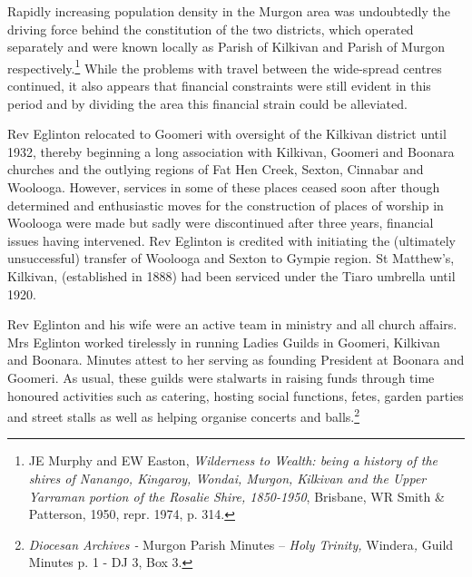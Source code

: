 Rapidly increasing population density in the Murgon area was undoubtedly the driving force behind the constitution of the two districts, which operated separately and were known locally as Parish of Kilkivan and Parish of Murgon respectively.\footnote{JE Murphy and EW Easton, \emph{Wilderness to Wealth: being a history of the shires of Nanango, Kingaroy, Wondai, Murgon, Kilkivan and the Upper Yarraman portion of the Rosalie Shire, 1850-1950}, Brisbane, WR Smith \& Patterson, 1950, repr. 1974, p. 314.} While the problems with travel between the wide-spread centres continued, it also appears that financial constraints were still evident in this period and by dividing the area this financial strain could be alleviated.


Rev Eglinton relocated to Goomeri with oversight of the Kilkivan district until 1932, thereby beginning a long association with Kilkivan, Goomeri and Boonara churches and the outlying regions of Fat Hen Creek, Sexton, Cinnabar and Woolooga. However, services in some of these places ceased soon after though determined and enthusiastic moves for the construction of places of worship in Woolooga were made but sadly were discontinued after three years, financial issues having intervened. Rev Eglinton is credited with initiating the (ultimately unsuccessful) transfer of Woolooga and Sexton to Gympie region. St Matthew's, Kilkivan, (established in 1888) had been serviced under the Tiaro umbrella until 1920.



Rev Eglinton and his wife were an active team in ministry and all church affairs. Mrs Eglinton worked tirelessly in running Ladies Guilds in Goomeri, Kilkivan and Boonara. Minutes attest to her serving as founding President at Boonara and Goomeri. As usual, these guilds were stalwarts in raising funds through time honoured activities such as catering, hosting social functions, fetes, garden parties and street stalls as well as helping organise concerts and balls.\footnote{\emph{Diocesan Archives -} Murgon Parish Minutes -- \emph{Holy Trinity,} Windera\emph{,} Guild Minutes p. 1 - DJ 3, Box 3.}


\balance


